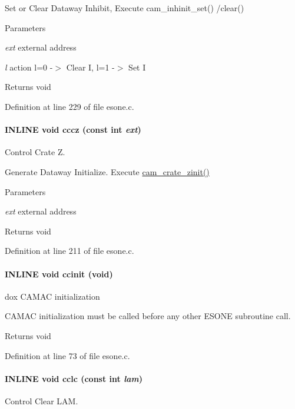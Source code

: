Set or Clear Dataway Inhibit, Execute cam\_\-inhinit\_\-set() /clear()


\begin{DoxyParams}{Parameters}
\item[{\em ext}]external address \item[{\em l}]action l=0 -\/$>$ Clear I, l=1 -\/$>$ Set I \end{DoxyParams}
\begin{DoxyReturn}{Returns}
void 
\end{DoxyReturn}


Definition at line 229 of file esone.c.
\paragraph[{cccz}]{\setlength{\rightskip}{0pt plus 5cm}INLINE void cccz (const int {\em ext})}\hfill\label{esone_8c_a6cc6387b2bfdded1a228fde3a594de3c}
Control Crate Z.

Generate Dataway Initialize. Execute \hyperlink{group__mcstdfunctionh_ga476ffc902c4674e17aa3b544781023e4}{cam\_\-crate\_\-zinit()}


\begin{DoxyParams}{Parameters}
\item[{\em ext}]external address \end{DoxyParams}
\begin{DoxyReturn}{Returns}
void 
\end{DoxyReturn}


Definition at line 211 of file esone.c.
\paragraph[{ccinit}]{\setlength{\rightskip}{0pt plus 5cm}INLINE void ccinit (void)}\hfill\label{esone_8c_aed67ed875fc4e8bb8979077473e21430}
dox CAMAC initialization

CAMAC initialization must be called before any other ESONE subroutine call.

\begin{DoxyReturn}{Returns}
void 
\end{DoxyReturn}


Definition at line 73 of file esone.c.
\paragraph[{cclc}]{\setlength{\rightskip}{0pt plus 5cm}INLINE void cclc (const int {\em lam})}\hfill\label{esone_8c_a9ed3915f053ab503de13e18cd1f5a82d}
Control Clear LAM.

